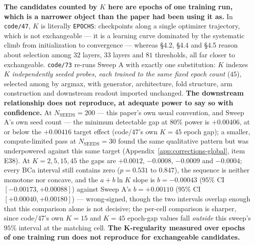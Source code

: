 \documentclass[10pt]{article} %
\begin{document}
\textbf{The candidates counted by $K$ here are epochs of one training run,
which is a narrower object than the paper had been using it as.} In
\texttt{code/47}, $K$ is literally \texttt{EPOCHS}: checkpoints along a single
optimizer trajectory, which is not exchangeable --- it is a learning curve
dominated by the systematic climb from initialization to convergence --- whereas
§4.2, §4.4 and §4.5 reason about selection among $32$ layers, $33$ layers and
$81$ thresholds, all far closer to exchangeable. \texttt{code/73} re-runs Sweep
A with exactly one substitution: $K$ indexes $K$ \emph{independently seeded
probes, each trained to the same fixed epoch count} ($45$), selected among by
argmax, with generator, architecture, fold structure, arm construction and
downstream readout imported unchanged. \textbf{The downstream relationship does
not reproduce, at adequate power to say so with confidence.} At
$N_{\text{SEEDS}}=200$ --- this paper's own usual convention, and Sweep A's
own seed count --- the minimum detectable gap at $80\%$ power is $+0.00406$,
at or below the $+0.00416$ target effect (code/47's own $K{=}45$ epoch gap); a
smaller, compute-limited pass at $N_{\text{SEEDS}}=30$ found the same
qualitative pattern but was underpowered against this same target
(Appendix~\ref{app:corrections-global}, item E38). At $K=2,5,15,45$ the gaps
are $+0.0012$, $-0.0008$, $-0.0009$ and $-0.0004$; every BCa interval still
contains zero ($p=0.531$ to $0.847$), the sequence is neither monotone nor
concave, and the $a+b\ln K$ slope is $b=-0.00043$ ($95\%$ CI
$[-0.00173,+0.00088]$) against Sweep A's $b=+0.00110$ ($95\%$ CI
$[+0.00040,+0.00180]$) --- wrong-signed, though the two intervals overlap
enough that this comparison alone is not decisive; the per-cell comparison is
sharper, since code/47's own $K{=}15$ and $K{=}45$ epoch-gap values fall
\emph{outside} this sweep's $95\%$ interval at the matching cell. \textbf{The
K-regularity measured over epochs of one training run does not reproduce for
exchangeable candidates.}
\end{document}
